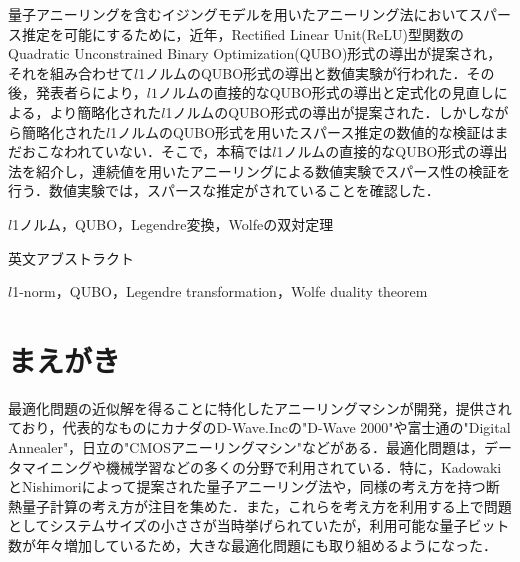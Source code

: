 \documentclass[technicalreport]{ieicej}
\begin{document}
\begin{jabstract}
  量子アニーリングを含むイジングモデルを用いたアニーリング法においてスパース推定を可能にするために，近年，Rectified Linear Unit(ReLU)型関数のQuadratic Unconstrained Binary Optimization(QUBO)形式の導出が提案され，それを組み合わせて$l$1ノルムのQUBO形式の導出と数値実験が行われた．その後，発表者らにより，$l1$ノルムの直接的なQUBO形式の導出と定式化の見直しによる，より簡略化された$l$1ノルムのQUBO形式の導出が提案された．しかしながら簡略化された$l$1ノルムのQUBO形式を用いたスパース推定の数値的な検証はまだおこなわれていない．そこで，本稿では$l$1ノルムの直接的なQUBO形式の導出法を紹介し，連続値を用いたアニーリングによる数値実験でスパース性の検証を行う．数値実験では，スパースな推定がされていることを確認した．
\end{jabstract}
\begin{jkeyword}
$l$1ノルム，QUBO，Legendre変換，Wolfeの双対定理
\end{jkeyword}
\begin{eabstract}
英文アブストラクト
\end{eabstract}
\begin{ekeyword}
$l$1-norm，QUBO，Legendre transformation，Wolfe duality theorem
\end{ekeyword}
\maketitle

\section{まえがき}
最適化問題の近似解を得ることに特化したアニーリングマシンが開発，提供されており，代表的なものにカナダのD-Wave.Inc\cite{d-wave01,d-wave02}の"D-Wave 2000"や富士通\cite{Digital_annealer}の"Digital Annealer"，日立の"CMOSアニーリングマシン"などがある．最適化問題は，データマイニングや機械学習などの多くの分野で利用されている．特に，KadowakiとNishimoriによって提案された量子アニーリング法\cite{Quantum_annealing}や，同様の考え方を持つ断熱量子計算\cite{AQC}の考え方が注目を集めた．また，これらを考え方を利用する上で問題としてシステムサイズの小ささが当時挙げられていたが，利用可能な量子ビット数が年々増加しているため，大きな最適化問題にも取り組めるようになった．
\end{document}
